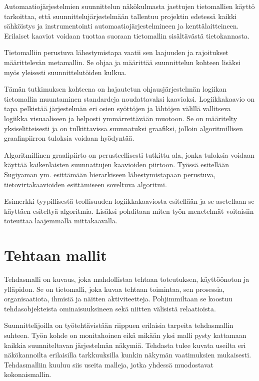 \documentclass[finnish,12pt]{article}
\begin{document}
Automaatiojärjestelmien suunnittelun näkökulmasta jaettujen tietomallien käyttö tarkoittaa,
että suunnittelujärjestelmään tallentuu projektin edetessä kaikki sähköistys ja instrumentointi automaatiojärjestelmineen ja kenttälaitteineen.
Erilaiset kaaviot voidaan tuottaa suoraan tietomallin sisältävästä tietokannasta.

Tietomalliin perustuva lähestymistapa vaatii sen laajuuden ja rajoitukset määrittelevän metamallin.
Se ohjaa ja määrittää suunnittelun kohteen lisäksi myös yleisesti suunnittelutöiden kulkua.

Tämän tutkimuksen kohteena on hajautetun ohjausjärjestelmän logiikan tietomallin muuntaminen standardeja noudattavaksi kaavioksi.
Logiikkakaavio on tapa pelkistää järjestelmän eri osien syöttöjen ja lähtöjen välillä vallitseva logiikka visuaaliseen ja helposti ymmärrettävään muotoon.
Se on määritelty yksiselitteisesti ja on tulkittavissa suunnatuksi graafiksi, jolloin algoritmillisen graafinpiirron tuloksia voidaan hyödyntää.

Algoritmillinen graafipiirto on perusteellisesti tutkittu ala, jonka tuloksia voidaan käyttää kaikenlaisten suunnattujen kaavioiden piirtoon.
Työssä esitellään Sugiyaman ym. \cite{RefWorks:9} esittämään hierarkiseen lähestymistapaan perustuva, tietovirtakaavioiden esittämiseen soveltuva algoritmi.

Esimerkki tyypillisestä teollisuuden logiikkakaaviosta esitellään ja se asetellaan se käyttäen esiteltyä algoritmia.
Lisäksi pohditaan miten työn menetelmät voitaisiin toteuttaa laajemmalla mittakaavalla.

	\clearpage
	\section{Tehtaan mallit}

Tehdasmalli on kuvaus, joka mahdollistaa tehtaan toteutuksen, käyttöönoton ja ylläpidon.
Se on tietomalli, joka kuvaa tehtaan toimintaa, sen prosessia, organisaatiota, ihmisiä ja näitten aktiviteetteja.
Pohjimmiltaan se koostuu tehdasobjekteista ominaisuuksineen sekä niitten välisistä relaatioista. \cite{RefWorks:41}

Suunnittelijoilla on työtehtävistään riippuen erilaisia tarpeita tehdasmallin suhteen.
Työn kohde on monitahoinen eikä mikään yksi malli pysty kattamaan kaikkia suunniteltavan järjestelmän näkymiä.
Tehdasta tulee kuvata useilta eri näkökannoilta erilaisilla tarkkuuksilla kunkin näkymän vaatimuksien mukaisesti.
Tehdasmalliin kuuluu siis useita malleja, jotka yhdessä muodostavat kokonaismallin.
\end{document}
